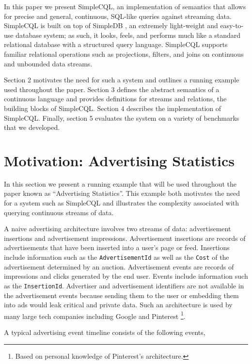 \documentclass[a4paper, 10pt, conference]{IEEEconf}
\begin{document}
In this paper we present SimpleCQL, an implementation of semantics that allows for precise and general, continuous, SQL-like queries against streaming data.  SimpleCQL is built on top of SimpleDB \cite{simpledb}, an extremely light-weight and easy-to-use database system; as such, it looks, feels, and performs much like a standard relational database with a structured query language. SimpleCQL supports  familiar relational operations such as projections, filters, and joins on continuous and unbounded data streams.

Section 2 motivates the need for such a system and outlines a running example used throughout the paper.  Section 3 defines the abstract semantics of a continuous language and provides definitions for streams and relations, the building blocks of SimpleCQL.  Section 4 describes the implementation of SimpleCQL.  Finally, section 5 evaluates the system on a variety of benchmarks that we developed.


\section{Motivation: Advertising Statistics}
In this section we present a running example that will be used throughout the paper known as ``Advertising Statistics''.  This example both motivates the need for a system such as SimpleCQL and illustrates the complexity associated with querying continuous streams of data.

A naive advertising architecture involves two streams of data: advertisement insertions and advertisement impressions.  Advertisement insertions are records of advertisements that have been inserted into a user's page or feed.  Insertions include information such as the \texttt{AdvertisementId} as well as the \texttt{Cost} of the advertisement determined by an auction.  Advertisement events are records of impressions and clicks generated by the end user.  Events include information such as the \texttt{InsertionId}.  Advertiser and advertisement identifiers are not available in the advertisement events because sending them to the user or embedding them into ads would leak critical and private data. Such an architecture is used by many large tech companies including Google \cite{photon} and Pinterest \footnote{Based on personal knowledge of Pinterest's architecture.}. 


A typical advertising event timeline consists of the following events,
\end{document}
